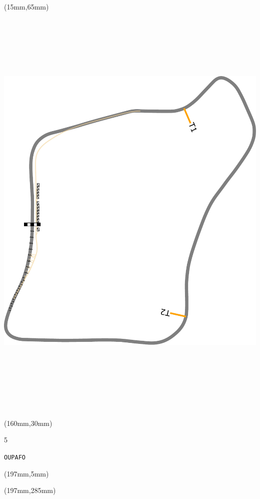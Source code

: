 \begin{textblock*}{185mm}(15mm,65mm)%
\centering
\mbox{\includegraphics[width=185mm,height=210mm,keepaspectratio]{PT/OUPAFO.pdf}}
\end{textblock*}
\begin{textblock*}{40mm}(160mm,30mm)%
\Large
\par{} 
\par5 
\par\hfill\tiny\tt OUPAFO\\
\end{textblock*}
\begin{textblock*}{20mm}(197mm,5mm)%
\fbox{\thepage}
\label{OUPAFO}
\end{textblock*}
\begin{textblock*}{20mm}(197mm,285mm)%
\fbox{\thepage}
\end{textblock*}


